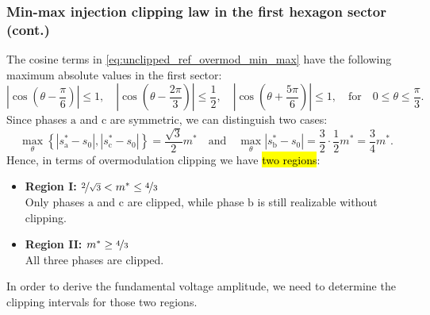 \begin{frame}
    \frametitle{Min-max injection clipping law in the first hexagon sector (cont.)}
    The cosine terms in \eqref{eq:unclipped_ref_overmod_min_max} have the following maximum absolute values in the first sector:
    \begin{equation}
        \left|\cos\left(\theta - \frac{\pi}{6}\right)\right|  \leq 1,                                                                                     \quad
        \left|\cos\left(\theta - \frac{2\pi}{3}\right)\right|  \leq \frac{1}{2},       \quad
        \left|\cos\left(\theta + \frac{5\pi}{6}\right)\right|  \leq 1, \quad \text{for} \quad 0 \le \theta \le \frac{\pi}{3}.
    \end{equation}\pause
    Since phases $\mathrm{a}$ and $\mathrm{c}$ are symmetric, we can distinguish two cases:
    \begin{equation}
        \max_\theta \left\{|s_\mathrm{a}^*- s_0|, |s_\mathrm{c}^*- s_0|\right\} = \frac{\sqrt{3}}{2}m^* \quad \text{and} \quad \max_\theta |s_\mathrm{b}^*- s_0| = \frac{3}{2}\cdot\frac{1}{2}m^* = \frac{3}{4}m^*.
    \end{equation}\pause
    Hence, in terms of overmodulation clipping we have \hl{two regions}:
    \begin{itemize}
        \item \textbf{Region I: \(\nicefrac{2}{\sqrt{3}} < m^* \le \nicefrac{4}{3}\)}\\
              Only phases $\mathrm{a}$ and $\mathrm{c}$ are clipped, while phase $\mathrm{b}$ is still realizable without clipping. \pause
        \item \textbf{Region II: \(m^* \ge \nicefrac{4}{3}\)}\\
              All three phases are clipped.
    \end{itemize}
    In order to derive the fundamental voltage amplitude, we need to determine the clipping intervals for those two regions.
\end{frame}

